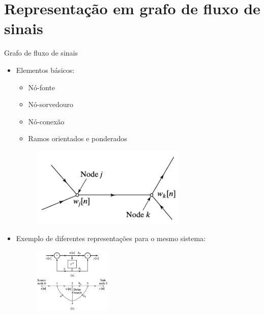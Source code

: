 \section{Representação em grafo de fluxo de sinais}
\begin{slide}{Grafo de fluxo de sinais}    
    \begin{itemize}
   \item Elementos básicos:
   \begin{minipage}{\textwidth}
   \begin{minipage}{0.49\textwidth}
    \begin{itemize}
      \item Nó-fonte
      \item Nó-sorvedouro
      \item Nó-conexão
      \item Ramos orientados e ponderados
    \end{itemize}
   \end{minipage}
   \begin{minipage}{0.49\textwidth}
   \begin{figure}
       \centering
        \includegraphics[width = 0.7\textwidth]{figs/graph}
   \end{figure}
   \end{minipage}
   \end{minipage}
   \item Exemplo de diferentes representações para o mesmo sistema:
   \begin{figure}
       \centering
        \includegraphics[width = 0.35\textwidth]{figs/block-graph-ex.eps}
   \end{figure}
\end{itemize}
\end{slide}

